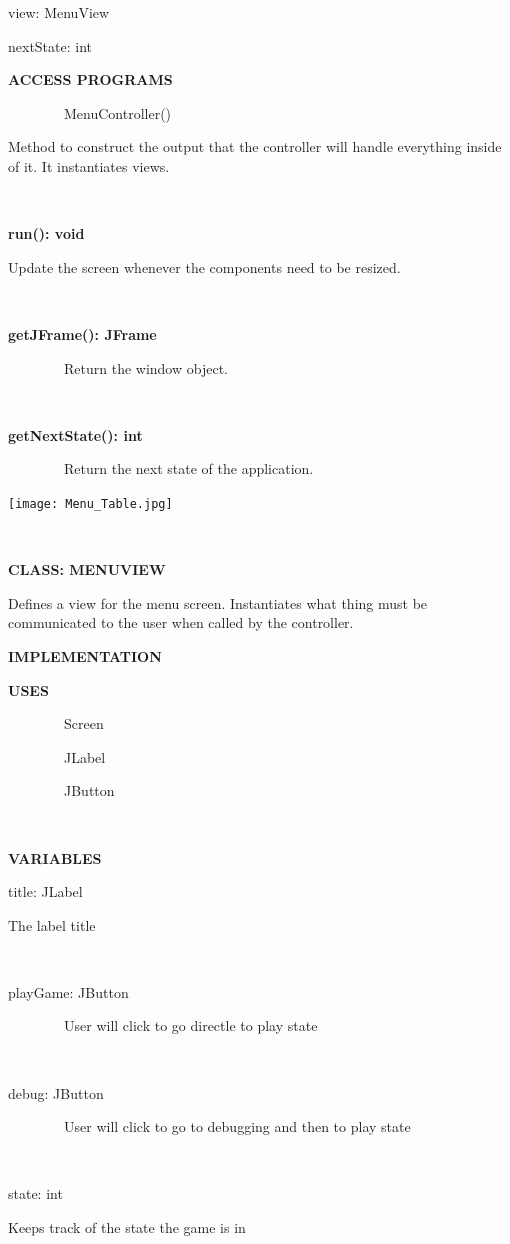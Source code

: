 \documentclass{article}
\begin{document}
{{{view: MenuView}

{nextState: int}

{\textbf{ACCESS PROGRAMS}}

{~~~~~~~~MenuController()}

{Method to construct the output that the controller will handle everything inside of it. It instantiates views.}

{~~~~~~~~}

{\textbf{run(): void}}

{Update the screen whenever the components need to be resized.~~~~~~~~}

{~~~~~~~~}

{\textbf{getJFrame(): JFrame}}

{~~~~~~~~Return the window object.}

{~~~~~~~~~~~~~~~~}

{\textbf{getNextState(): int}}

{~~~~~~~~Return the next state of the application.}

\texttt{[image: Menu\_Table.jpg]}

{~~~~~~~~~~~~~~~~}



{}

{\textbf{CLASS: MENUVIEW}}

{Defines a view for the menu screen. Instantiates what thing must be
communicated to the user when called by the controller.}

{\textbf{IMPLEMENTATION}}

{\textbf{USES}}

{~~~~~~~~Screen}

{~~~~~~~~JLabel}

{~~~~~~~~JButton}

{~~~~~~~~}

{\textbf{VARIABLES}}

{title: JLabel}

{The label title~~~~~~~~}

{~}

{playGame: JButton}

{~~~~~~~~User will click to go directle to play state}

{~~~~~~~~}

{debug: JButton}

{~~~~~~~~User will click to go to debugging and then to play state}

{~~~~~~~~}

{state: int}

{Keeps track of the state the game is in}

}}
\end{document}
